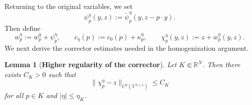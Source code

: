 \documentclass[preprint]{elsarticle}
\newtheorem{lemma}{Lemma}[section]
\numberwithin{equation}{section}
\begin{document}
Returning to the original variables, we set
\begin{equation*}
\psi_p^\eta(y,z)
:=
\widetilde\psi_p^\eta(y,z-p\cdot y).
\end{equation*}
Then define
\begin{equation*}
w_p^\eta:=w_p^0+\psi_p^\eta,
\qquad
c_\eta(p):=c_0(p)+\kappa_p^\eta,
\qquad
\chi_p^\eta(y,z):=z+w_p^\eta(y,z).
\end{equation*}
We next derive the corrector estimates needed in the homogenization argument.
\begin{lemma}[\textbf{Higher regularity of the corrector}]
Let $K\Subset\mathbb R^N$. Then there exists $C_K>0$ such that
\begin{equation*}
\|\chi_p^\eta-z\|_{C^2(\mathbb T^{N+1})}\le C_K
\end{equation*}
for all $p\in K$ and $|\eta|\le\eta_K$.
\end{lemma}
\end{document}
